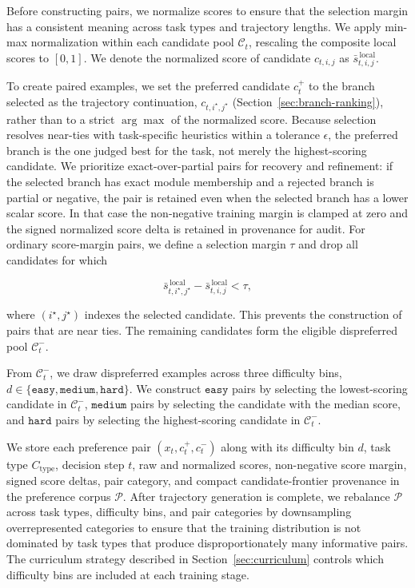 \documentclass[thesis,letterpaper,12pt]{utthesis}
\begin{document}
Before constructing pairs, we normalize scores to ensure that the selection margin has a consistent meaning across task types and trajectory lengths. We apply min-max normalization within each candidate pool $\mathcal{C}_t$, rescaling the composite local scores to $[0, 1]$. We denote the normalized score of candidate $c_{t,i,j}$ as $\bar{s}^{\,\text{local}}_{t,i,j}$.

To create paired examples, we set the preferred candidate $c_t^+$ to the branch selected as the trajectory continuation, $c_{t,i^\star, j^\star}$ (Section~\ref{sec:branch-ranking}), rather than to a strict $\arg\max$ of the normalized score. Because selection resolves near-ties with task-specific heuristics within a tolerance $\epsilon$, the preferred branch is the one judged best for the task, not merely the highest-scoring candidate. We prioritize exact-over-partial pairs for recovery and refinement: if the selected branch has exact module membership and a rejected branch is partial or negative, the pair is retained even when the selected branch has a lower scalar score. In that case the non-negative training margin is clamped at zero and the signed normalized score delta is retained in provenance for audit. For ordinary score-margin pairs, we define a selection margin $\tau$ and drop all candidates for which

\[
    \bar{s}^{\,\text{local}}_{t,i^\star,j^\star} - \bar{s}^{\,\text{local}}_{t,i,j} < \tau,
\]

where $(i^\star, j^\star)$ indexes the selected candidate. This prevents the construction of pairs that are near ties. The remaining candidates form the eligible dispreferred pool $\mathcal{C}_t^{-}$.

From $\mathcal{C}_t^{-}$, we draw dispreferred examples across three difficulty bins, $d \in \{\texttt{easy}, \texttt{medium}, \texttt{hard}\}$. We construct $\texttt{easy}$ pairs by selecting the lowest-scoring candidate in $\mathcal{C}_t^{-}$, $\texttt{medium}$ pairs by selecting the candidate with the median score, and $\texttt{hard}$ pairs by selecting the highest-scoring candidate in $\mathcal{C}_t^{-}$.

We store each preference pair $(x_t, c_t^+, c_t^-)$ along with its difficulty bin $d$, task type $C_{\text{type}}$, decision step $t$, raw and normalized scores, non-negative score margin, signed score deltas, pair category, and compact candidate-frontier provenance in the preference corpus $\mathcal{P}$. After trajectory generation is complete, we rebalance $\mathcal{P}$ across task types, difficulty bins, and pair categories by downsampling overrepresented categories to ensure that the training distribution is not dominated by task types that produce disproportionately many informative pairs. The curriculum strategy described in Section~\ref{sec:curriculum} controls which difficulty bins are included at each training stage.
\end{document}
